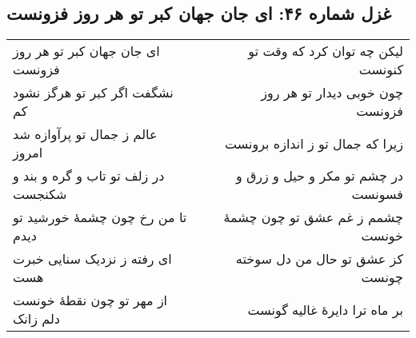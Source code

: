 \begin{center}
\section*{غزل شماره ۴۶: ای جان جهان کبر تو هر روز فزونست}
\label{sec:046}
\begin{longtable}{l p{0.5cm} r}
ای جان جهان کبر تو هر روز فزونست
&&
لیکن چه توان کرد که وقت تو کنونست
\\
نشگفت اگر کبر تو هرگز نشود کم
&&
چون خوبی دیدار تو هر روز فزونست
\\
عالم ز جمال تو پرآوازه شد امروز
&&
زیرا که جمال تو ز اندازه برونست
\\
در زلف تو تاب و گره و بند و شکنجست
&&
در چشم تو مکر و حیل و زرق و فسونست
\\
تا من رخ چون چشمهٔ خورشید تو دیدم
&&
چشمم ز غم عشق تو چون چشمهٔ خونست
\\
ای رفته ز نزدیک سنایی خبرت هست
&&
کز عشق تو حال من دل سوخته چونست
\\
از مهر تو چون نقطهٔ خونست دلم زانک
&&
بر ماه ترا دایرهٔ غالیه گونست
\\
\end{longtable}
\end{center}
